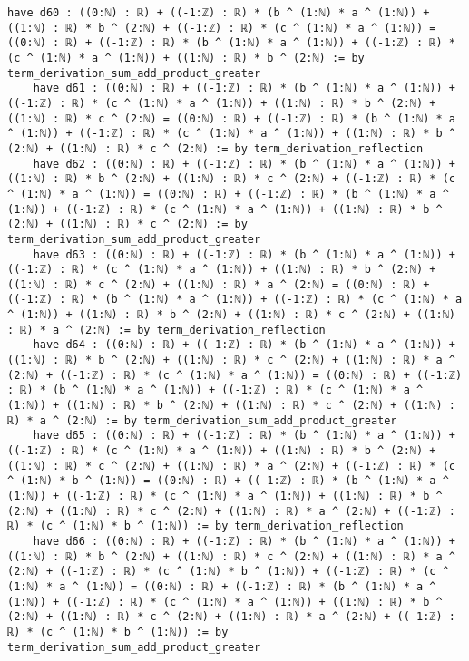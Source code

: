 \documentclass{article}
\begin{document}
\begin{tcolorbox}[colback=white!10, width=\linewidth]
\begin{lstlisting}[language=Lean4]
    have d60 : ((0:ℕ) : ℝ) + ((-1:ℤ) : ℝ) * (b ^ (1:ℕ) * a ^ (1:ℕ)) + ((1:ℕ) : ℝ) * b ^ (2:ℕ) + ((-1:ℤ) : ℝ) * (c ^ (1:ℕ) * a ^ (1:ℕ)) = ((0:ℕ) : ℝ) + ((-1:ℤ) : ℝ) * (b ^ (1:ℕ) * a ^ (1:ℕ)) + ((-1:ℤ) : ℝ) * (c ^ (1:ℕ) * a ^ (1:ℕ)) + ((1:ℕ) : ℝ) * b ^ (2:ℕ) := by term_derivation_sum_add_product_greater
    have d61 : ((0:ℕ) : ℝ) + ((-1:ℤ) : ℝ) * (b ^ (1:ℕ) * a ^ (1:ℕ)) + ((-1:ℤ) : ℝ) * (c ^ (1:ℕ) * a ^ (1:ℕ)) + ((1:ℕ) : ℝ) * b ^ (2:ℕ) + ((1:ℕ) : ℝ) * c ^ (2:ℕ) = ((0:ℕ) : ℝ) + ((-1:ℤ) : ℝ) * (b ^ (1:ℕ) * a ^ (1:ℕ)) + ((-1:ℤ) : ℝ) * (c ^ (1:ℕ) * a ^ (1:ℕ)) + ((1:ℕ) : ℝ) * b ^ (2:ℕ) + ((1:ℕ) : ℝ) * c ^ (2:ℕ) := by term_derivation_reflection
    have d62 : ((0:ℕ) : ℝ) + ((-1:ℤ) : ℝ) * (b ^ (1:ℕ) * a ^ (1:ℕ)) + ((1:ℕ) : ℝ) * b ^ (2:ℕ) + ((1:ℕ) : ℝ) * c ^ (2:ℕ) + ((-1:ℤ) : ℝ) * (c ^ (1:ℕ) * a ^ (1:ℕ)) = ((0:ℕ) : ℝ) + ((-1:ℤ) : ℝ) * (b ^ (1:ℕ) * a ^ (1:ℕ)) + ((-1:ℤ) : ℝ) * (c ^ (1:ℕ) * a ^ (1:ℕ)) + ((1:ℕ) : ℝ) * b ^ (2:ℕ) + ((1:ℕ) : ℝ) * c ^ (2:ℕ) := by term_derivation_sum_add_product_greater
    have d63 : ((0:ℕ) : ℝ) + ((-1:ℤ) : ℝ) * (b ^ (1:ℕ) * a ^ (1:ℕ)) + ((-1:ℤ) : ℝ) * (c ^ (1:ℕ) * a ^ (1:ℕ)) + ((1:ℕ) : ℝ) * b ^ (2:ℕ) + ((1:ℕ) : ℝ) * c ^ (2:ℕ) + ((1:ℕ) : ℝ) * a ^ (2:ℕ) = ((0:ℕ) : ℝ) + ((-1:ℤ) : ℝ) * (b ^ (1:ℕ) * a ^ (1:ℕ)) + ((-1:ℤ) : ℝ) * (c ^ (1:ℕ) * a ^ (1:ℕ)) + ((1:ℕ) : ℝ) * b ^ (2:ℕ) + ((1:ℕ) : ℝ) * c ^ (2:ℕ) + ((1:ℕ) : ℝ) * a ^ (2:ℕ) := by term_derivation_reflection
    have d64 : ((0:ℕ) : ℝ) + ((-1:ℤ) : ℝ) * (b ^ (1:ℕ) * a ^ (1:ℕ)) + ((1:ℕ) : ℝ) * b ^ (2:ℕ) + ((1:ℕ) : ℝ) * c ^ (2:ℕ) + ((1:ℕ) : ℝ) * a ^ (2:ℕ) + ((-1:ℤ) : ℝ) * (c ^ (1:ℕ) * a ^ (1:ℕ)) = ((0:ℕ) : ℝ) + ((-1:ℤ) : ℝ) * (b ^ (1:ℕ) * a ^ (1:ℕ)) + ((-1:ℤ) : ℝ) * (c ^ (1:ℕ) * a ^ (1:ℕ)) + ((1:ℕ) : ℝ) * b ^ (2:ℕ) + ((1:ℕ) : ℝ) * c ^ (2:ℕ) + ((1:ℕ) : ℝ) * a ^ (2:ℕ) := by term_derivation_sum_add_product_greater
    have d65 : ((0:ℕ) : ℝ) + ((-1:ℤ) : ℝ) * (b ^ (1:ℕ) * a ^ (1:ℕ)) + ((-1:ℤ) : ℝ) * (c ^ (1:ℕ) * a ^ (1:ℕ)) + ((1:ℕ) : ℝ) * b ^ (2:ℕ) + ((1:ℕ) : ℝ) * c ^ (2:ℕ) + ((1:ℕ) : ℝ) * a ^ (2:ℕ) + ((-1:ℤ) : ℝ) * (c ^ (1:ℕ) * b ^ (1:ℕ)) = ((0:ℕ) : ℝ) + ((-1:ℤ) : ℝ) * (b ^ (1:ℕ) * a ^ (1:ℕ)) + ((-1:ℤ) : ℝ) * (c ^ (1:ℕ) * a ^ (1:ℕ)) + ((1:ℕ) : ℝ) * b ^ (2:ℕ) + ((1:ℕ) : ℝ) * c ^ (2:ℕ) + ((1:ℕ) : ℝ) * a ^ (2:ℕ) + ((-1:ℤ) : ℝ) * (c ^ (1:ℕ) * b ^ (1:ℕ)) := by term_derivation_reflection
    have d66 : ((0:ℕ) : ℝ) + ((-1:ℤ) : ℝ) * (b ^ (1:ℕ) * a ^ (1:ℕ)) + ((1:ℕ) : ℝ) * b ^ (2:ℕ) + ((1:ℕ) : ℝ) * c ^ (2:ℕ) + ((1:ℕ) : ℝ) * a ^ (2:ℕ) + ((-1:ℤ) : ℝ) * (c ^ (1:ℕ) * b ^ (1:ℕ)) + ((-1:ℤ) : ℝ) * (c ^ (1:ℕ) * a ^ (1:ℕ)) = ((0:ℕ) : ℝ) + ((-1:ℤ) : ℝ) * (b ^ (1:ℕ) * a ^ (1:ℕ)) + ((-1:ℤ) : ℝ) * (c ^ (1:ℕ) * a ^ (1:ℕ)) + ((1:ℕ) : ℝ) * b ^ (2:ℕ) + ((1:ℕ) : ℝ) * c ^ (2:ℕ) + ((1:ℕ) : ℝ) * a ^ (2:ℕ) + ((-1:ℤ) : ℝ) * (c ^ (1:ℕ) * b ^ (1:ℕ)) := by term_derivation_sum_add_product_greater

\end{lstlisting}
\end{tcolorbox}
\end{document}
